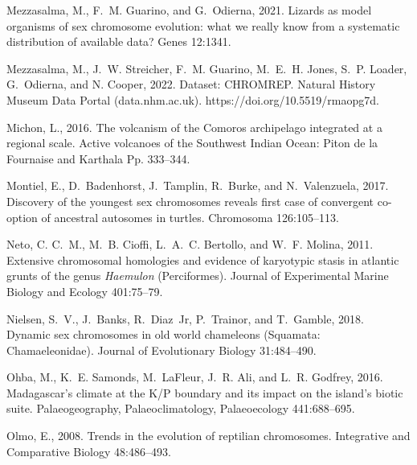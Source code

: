 \documentclass[a4paper, 12pt]{article}
\begin{document}
\begin{thebibliography}{73}
Mezzasalma, M., F.~M. Guarino, and G.~Odierna, 2021.
\newblock Lizards as model organisms of sex chromosome evolution: what we
  really know from a systematic distribution of available data?
\newblock Genes 12:1341.

Mezzasalma, M., J.~W. Streicher, F.~M. Guarino, M.~E.~H. Jones, S.~P. Loader, G.~Odierna, and N. Cooper, 2022.
\newblock Dataset: CHROMREP. Natural History Museum Data Portal (data.nhm.ac.uk). https://doi.org/10.5519/rmaopg7d.

Michon, L., 2016.
\newblock The volcanism of the {C}omoros archipelago integrated at a regional
  scale.
\newblock Active volcanoes of the Southwest Indian Ocean: Piton de la Fournaise
  and Karthala Pp. 333--344.

Montiel, E., D.~Badenhorst, J.~Tamplin, R.~Burke, and N.~Valenzuela, 2017.
\newblock Discovery of the youngest sex chromosomes reveals first case of
  convergent co-option of ancestral autosomes in turtles.
\newblock Chromosoma 126:105--113.

Neto, C. C.~M., M.~B. Cioffi, L.~A.~C. Bertollo, and W.~F. Molina, 2011.
\newblock Extensive chromosomal homologies and evidence of karyotypic stasis in
  atlantic grunts of the genus \textit{Haemulon} ({P}erciformes).
\newblock Journal of Experimental Marine Biology and Ecology 401:75--79.

Nielsen, S.~V., J.~Banks, R.~Diaz~Jr, P.~Trainor, and T.~Gamble, 2018.
\newblock Dynamic sex chromosomes in old world chameleons ({S}quamata:
  {C}hamaeleonidae).
\newblock Journal of Evolutionary Biology 31:484--490.

Ohba, M., K.~E. Samonds, M.~LaFleur, J.~R. Ali, and L.~R. Godfrey, 2016.
\newblock Madagascar's climate at the {K}/{P} boundary and its impact on the
  island's biotic suite.
\newblock Palaeogeography, Palaeoclimatology, Palaeoecology 441:688--695.

Olmo, E., 2008.
\newblock Trends in the evolution of reptilian chromosomes.
\newblock Integrative and Comparative Biology 48:486--493.


\end{thebibliography}
\end{document}
